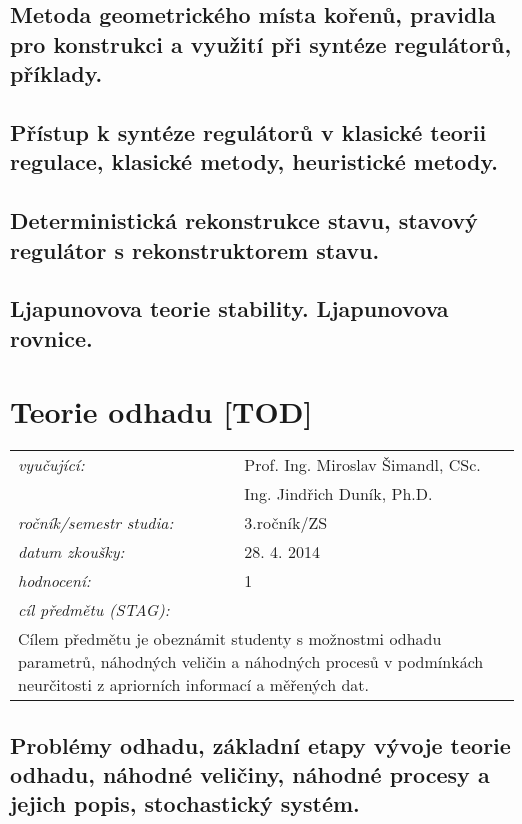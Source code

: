 \subsection{Metoda geometrického místa kořenů, pravidla pro konstrukci a využití při syntéze regulátorů, příklady.}

\subsection{Přístup k syntéze regulátorů v klasické teorii regulace, klasické metody, heuristické metody.}

\subsection{Deterministická rekonstrukce stavu, stavový regulátor s rekonstruktorem stavu.}

\subsection{Ljapunovova teorie stability. Ljapunovova rovnice.}

\section{Teorie odhadu [TOD]}

\begin{table}[H]
\centering
\begin{tabular}{p{4cm} p{12cm}}
\textit{vyučující:}             & Prof. Ing. Miroslav Šimandl, CSc. \\
								 & Ing. Jindřich Duník, Ph.D. \\
\textit{ročník/semestr studia:} & 3.ročník/ZS \\
\textit{datum zkoušky:}         & 28. 4. 2014 \\
\textit{hodnocení:}             & 1 \\
\textit{cíl předmětu (STAG):}   & \\
\multicolumn{2}{p{16cm}}{Cílem předmětu je obeznámit studenty s možnostmi odhadu parametrů, náhodných veličin a náhodných procesů v podmínkách neurčitosti z apriorních informací a měřených dat.}
\end{tabular}
\end{table}

\subsection{Problémy odhadu, základní etapy vývoje teorie odhadu, náhodné veličiny, náhodné procesy a jejich popis, stochastický systém.}

